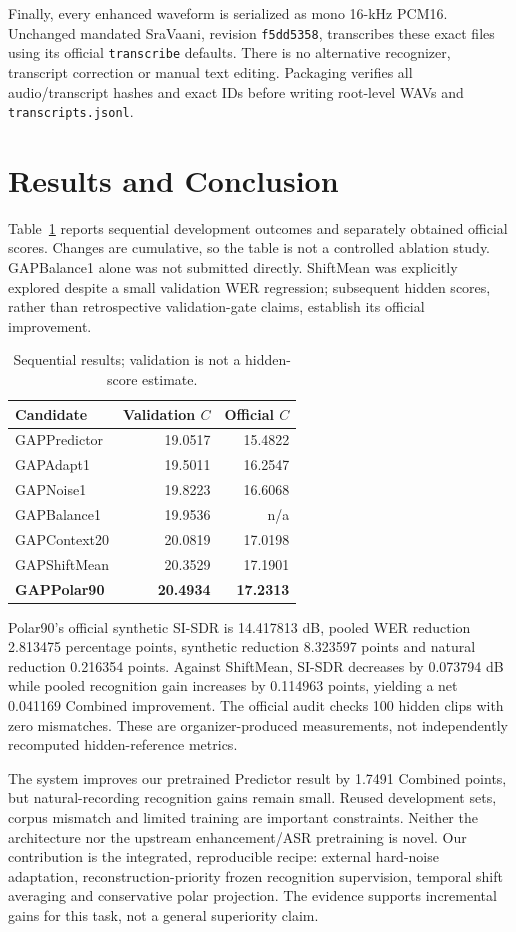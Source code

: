 \documentclass[conference]{IEEEtran}
\begin{document}
Finally, every enhanced waveform is serialized as mono 16-kHz PCM16. Unchanged mandated SraVaani, revision \texttt{f5dd5358}, transcribes these exact files using its official \texttt{transcribe} defaults. There is no alternative recognizer, transcript correction or manual text editing. Packaging verifies all audio/transcript hashes and exact IDs before writing root-level WAVs and \texttt{transcripts.jsonl}.

\section{Results and Conclusion}
Table~\ref{tab:results} reports sequential development outcomes and separately obtained official scores. Changes are cumulative, so the table is not a controlled ablation study. GAPBalance1 alone was not submitted directly. ShiftMean was explicitly explored despite a small validation WER regression; subsequent hidden scores, rather than retrospective validation-gate claims, establish its official improvement.
\begin{table}[t]
\caption{Sequential results; validation is not a hidden-score estimate.}
\label{tab:results}\centering
\begin{tabular}{lrr}\toprule
Candidate & Validation $C$ & Official $C$\\\midrule
GAPPredictor &19.0517&15.4822\\
GAPAdapt1 &19.5011&16.2547\\
GAPNoise1 &19.8223&16.6068\\
GAPBalance1 &19.9536&n/a\\
GAPContext20 &20.0819&17.0198\\
GAPShiftMean &20.3529&17.1901\\
\textbf{GAPPolar90} &\textbf{20.4934}&\textbf{17.2313}\\\bottomrule
\end{tabular}
\end{table}

Polar90's official synthetic SI-SDR is 14.417813 dB, pooled WER reduction 2.813475 percentage points, synthetic reduction 8.323597 points and natural reduction 0.216354 points. Against ShiftMean, SI-SDR decreases by 0.073794 dB while pooled recognition gain increases by 0.114963 points, yielding a net 0.041169 Combined improvement. The official audit checks 100 hidden clips with zero mismatches. These are organizer-produced measurements, not independently recomputed hidden-reference metrics.

The system improves our pretrained Predictor result by 1.7491 Combined points, but natural-recording recognition gains remain small. Reused development sets, corpus mismatch and limited training are important constraints. Neither the architecture nor the upstream enhancement/ASR pretraining is novel. Our contribution is the integrated, reproducible recipe: external hard-noise adaptation, reconstruction-priority frozen recognition supervision, temporal shift averaging and conservative polar projection. The evidence supports incremental gains for this task, not a general superiority claim.
\end{document}
